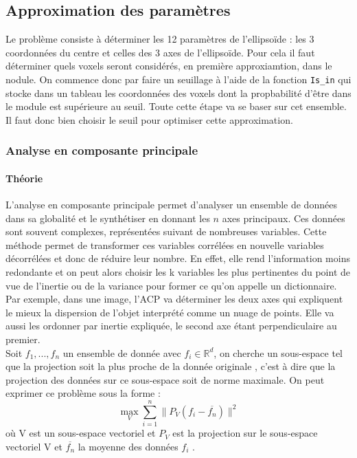 \documentclass{article}
\begin{document}
\subsection{Approximation des paramètres}

Le problème consiste à déterminer les 12 paramètres de l'ellipsoïde : les 3 coordonnées du centre et celles des 3 axes de l'ellipsoïde. Pour cela il faut déterminer quels voxels seront considérés, en première approxiamtion, dans le nodule. On commence donc par faire un seuillage à  l'aide de la fonction  \texttt{Is\_in} qui stocke dans un tableau les coordonnées des voxels dont la propbabilité d'être dans le module est supérieure au seuil. Toute cette étape va se baser sur cet ensemble. Il faut donc bien choisir le seuil pour optimiser cette approximation.

\subsubsection{Analyse en composante principale}

\paragraph{Théorie} L'analyse en composante principale \cite{bib:PCA} permet d'analyser un ensemble de données dans sa globalité et le synthétiser en donnant les $n$ axes principaux. Ces données sont souvent complexes, représentées suivant de nombreuses variables. Cette méthode permet de transformer ces variables corrélées en nouvelle variables décorrélées et donc de réduire leur nombre. En effet, elle rend l'information moins redondante et on peut alors choisir les k variables les plus pertinentes du point de vue de l'inertie ou de la variance pour former ce qu'on appelle un dictionnaire. \\
Par exemple, dans une image, l'ACP va déterminer les deux axes qui expliquent le mieux la dispersion de l'objet interprété comme un nuage de points. Elle va aussi les ordonner par inertie expliquée, le second axe étant perpendiculaire au premier.\\

Soit $f_1,...,f_n$  un ensemble de donnée avec $f_i \in \mathbb{R}^d$, on cherche un sous-espace tel que la projection soit la plus proche de la donnée originale , c'est à dire que la projection des données sur ce sous-espace soit de norme maximale. On peut exprimer ce problème sous la forme :
$$\max_V \sum_{i=1}^n \parallel P_V(f_i-\overline{f_n}) \parallel ^2$$
où V est un sous-espace vectoriel et $P_V$ est la projection sur le sous-espace vectoriel V et $\overline{f_n}$ la moyenne des données $f_i$ .
\end{document}
